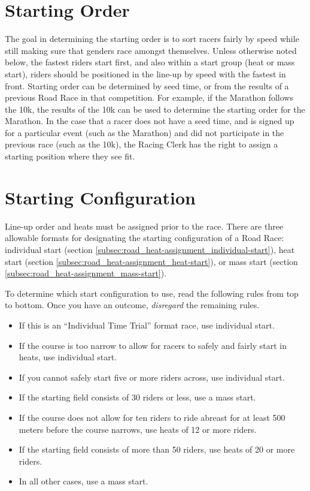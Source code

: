 \section{Starting Order}

The goal in determining the starting order is to sort racers fairly by speed while still making sure that genders race amongst themselves.
Unless otherwise noted below, the fastest riders start first, and also within a start group (heat or mass start), riders should be positioned in the line-up by speed with the fastest in front.
Starting order can be determined by seed time, or from the results of a previous Road Race in that competition.
For example, if the Marathon follows the 10k, the results of the 10k can be used to determine the starting order for the Marathon.
In the case that a racer does not have a seed time, and is signed up for a particular event (such as the Marathon) and did not participate in the previous race (such as the 10k), the Racing Clerk has the right to assign a starting position where they see fit.

\section{Starting Configuration}

Line-up order and heats must be assigned prior to the race.
There are three allowable formats for designating the starting configuration of a Road Race: individual start (section \ref{subsec:road_heat-assignment_individual-start}), heat start (section \ref{subsec:road_heat-assignment_heat-start}), or mass start (section \ref{subsec:road_heat-assignment_mass-start}).

To determine which start configuration to use, read the following rules from top to bottom.
Once you have an outcome, \emph{disregard} the remaining rules.
\begin{itemize}
\item If this is an ``Individual Time Trial'' format race, use individual start.
\item If the course is too narrow to allow for racers to safely and fairly start in heats, use individual start.
\item If you cannot safely start five or more riders across, use individual start.
\item If the starting field consists of 30 riders or less, use a mass start.
\item If the course does not allow for ten riders to ride abreast for at least 500 meters before the course narrows, use heats of 12 or more riders.
\item If the starting field consists of more than 50 riders, use heats of 20 or more riders.
\item In all other cases, use a mass start.
\end{itemize}

